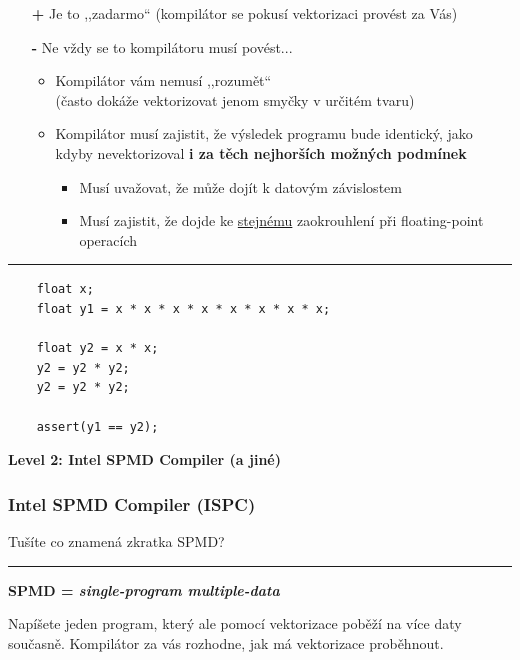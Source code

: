 \documentclass[usenames,dvipsnames,9pt]{beamer}
\begin{document}
\begin{frame}[fragile]
  \begin{itemize}
    \item[\LARGE\bf\textcolor{OliveGreen}{+}] Je to ,,zadarmo`` (kompilátor se pokusí vektorizaci provést za Vás) \\[2em]
    \pause
    \item[\LARGE\bf\textcolor{BrickRed}{-}] Ne vždy se to kompilátoru musí povést...
    \pause
    \begin{itemize}
      \item Kompilátor vám nemusí ,,rozumět``\\
            (často dokáže vektorizovat jenom smyčky v určitém tvaru) \\[0.6em]
      \pause
      \item Kompilátor musí zajistit, že výsledek programu bude identický, jako kdyby nevektorizoval \textbf{i za těch nejhorších možných podmínek}
            \begin{itemize}
              \item Musí uvažovat, že může dojít k datovým závislostem
              \item Musí zajistit, že dojde ke \underline{stejnému} zaokrouhlení při floating-point operacích
            \end{itemize}
    \end{itemize}
  \end{itemize}

  \pause
  \vspace{1em}\hrule\vspace{1em}

  \begin{verbatim}
    float x;
    float y1 = x * x * x * x * x * x * x * x;

    float y2 = x * x;
    y2 = y2 * y2;
    y2 = y2 * y2;

    assert(y1 == y2);
  \end{verbatim}
\end{frame}

\begin{frame}[fragile]
  \begin{center}
    \LARGE\bf Level 2: Intel SPMD Compiler (a jiné) \hspace{10pt}  
  \end{center}
\end{frame}

\begin{frame}
  \frametitle{Intel SPMD Compiler (ISPC)}

  \begin{center}
    \LARGE Tušíte co znamená zkratka SPMD?
  \end{center}

  \vspace{1em}\hrule\vspace{1em}

  \textbf{SPMD = \emph{single-program multiple-data}}

  Napíšete jeden program, který ale pomocí vektorizace poběží na více daty současně.
  Kompilátor za vás rozhodne, jak má vektorizace proběhnout.
\end{frame}
\end{document}
